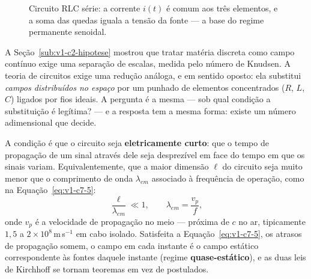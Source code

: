\documentclass[12pt,a4paper]{article}
\numberwithin{equation}{section}
\numberwithin{table}{section}
\numberwithin{figure}{section}
\begin{document}
\begin{figure}[H]
\centering
{}
\caption[Circuito RLC série alimentado por fonte senoidal.]{Circuito RLC
série: a corrente $i(t)$ é comum aos três elementos, e a soma das quedas
iguala a tensão da fonte --- a base do regime permanente senoidal.}
\label{fig:v1-c7-1}
\end{figure}


A Seção~\ref{sub:v1-c2-hipotese} mostrou que tratar matéria discreta como campo
contínuo exige uma separação de escalas, medida pelo número de Knudsen. A
teoria de circuitos exige uma redução análoga, e em sentido oposto: ela
substitui \emph{campos distribuídos no espaço} por um punhado de elementos
concentrados ($R$, $L$, $C$) ligados por fios ideais. A pergunta é a mesma ---
sob qual condição a substituição é legítima? --- e a resposta tem a mesma
forma: existe um número adimensional que decide.

A condição é que o circuito seja \textbf{eletricamente curto}: que o tempo de
propagação de um sinal através dele seja desprezível em face do tempo em que
os sinais variam. Equivalentemente, que a maior dimensão $\ell$ do circuito
seja muito menor que o comprimento de onda $\lambda_{em}$ associado à
frequência de operação, como na Equação~\eqref{eq:v1-c7-5}:
\begin{equation}\label{eq:v1-c7-5}
\frac{\ell}{\lambda_{em}} \ll 1,
\qquad \lambda_{em} = \frac{v_p}{f},
\end{equation}
onde $v_p$ é a velocidade de propagação no meio --- próxima de $c$ no ar,
tipicamente $1{,}5$ a $2\times10^{8}\,$m\,s$^{-1}$ em cabo isolado. Satisfeita a
Equação~\eqref{eq:v1-c7-5}, os atrasos de propagação somem, o campo em cada
instante é o campo estático correspondente às fontes daquele instante (regime
\textbf{quase-estático}), e as duas leis de Kirchhoff se tornam teoremas em vez
de postulados.
\end{document}
